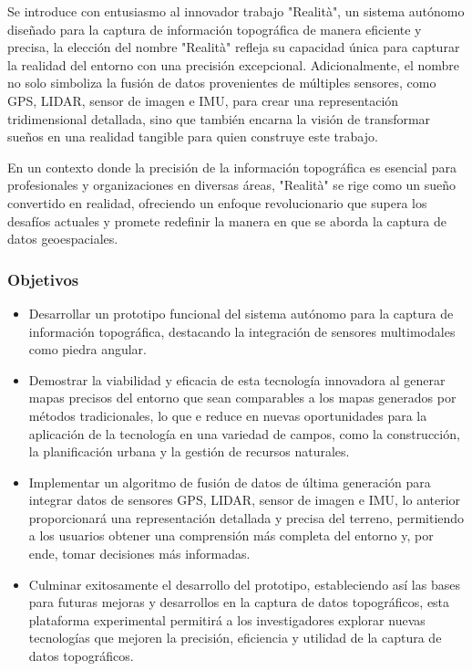 \documentclass[12pt,a4paper, twoside]{article} %
\begin{document}
Se introduce con entusiasmo al innovador trabajo "Realità", un sistema autónomo diseñado para la captura de información topográfica de manera eficiente y precisa, la elección del nombre "Realità" refleja su capacidad única para capturar la realidad del entorno con una precisión excepcional. Adicionalmente, el nombre no solo simboliza la fusión de datos provenientes de múltiples sensores, como GPS, LIDAR, sensor de imagen e IMU, para crear una representación tridimensional detallada, sino que también encarna la visión de transformar sueños en una realidad tangible para quien construye este trabajo.


En un contexto donde la precisión de la información topográfica es esencial para profesionales y organizaciones en diversas áreas, "Realità" se rige como un sueño convertido en realidad, ofreciendo un enfoque revolucionario que supera los desafíos actuales y promete redefinir la manera en que se aborda la captura de datos geoespaciales.


\subsubsection{Objetivos}
\label{subsec:org12e44a2}


\begin{itemize}

\item Desarrollar un prototipo funcional del sistema autónomo para la captura de información topográfica, destacando la integración de sensores multimodales como piedra angular.

\item Demostrar la viabilidad y eficacia de esta tecnología innovadora al generar mapas precisos del entorno que sean comparables a los mapas generados por métodos tradicionales, lo que e reduce en nuevas oportunidades para la aplicación de la tecnología en una variedad de campos, como la construcción, la planificación urbana y la gestión de recursos naturales.

\item Implementar un algoritmo de fusión de datos de última generación para integrar datos de sensores GPS, LIDAR, sensor de imagen e IMU, lo anterior proporcionará una representación detallada y precisa del terreno, permitiendo a los usuarios obtener una comprensión más completa del entorno y, por ende, tomar decisiones más informadas.

\item Culminar exitosamente el desarrollo del prototipo, estableciendo así las bases para futuras mejoras y desarrollos en la captura de datos topográficos, esta plataforma experimental permitirá a los investigadores explorar nuevas tecnologías que mejoren la precisión, eficiencia y utilidad de la captura de datos topográficos.
\end{itemize}
\end{document}
